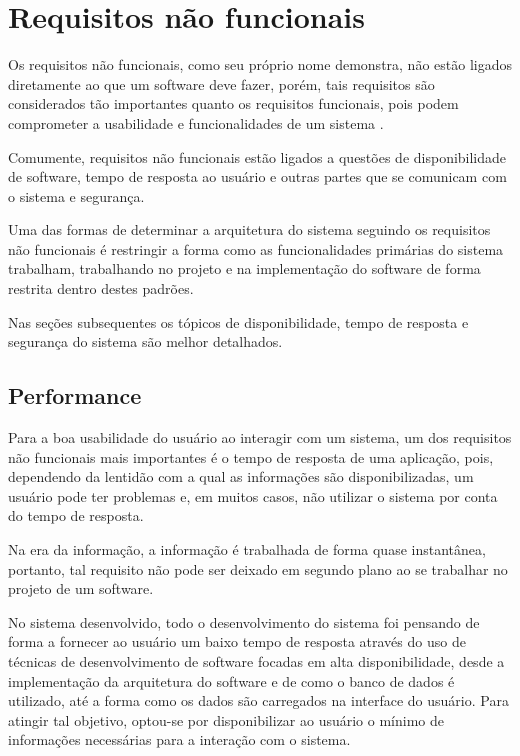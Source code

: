 \section{Requisitos não funcionais}

Os requisitos não funcionais, como seu próprio nome demonstra, não estão ligados diretamente ao que um software deve fazer, porém, tais requisitos são considerados tão importantes quanto os requisitos funcionais, pois podem comprometer a usabilidade e funcionalidades de um sistema \cite{engenharia_software_sommerville}.

Comumente, requisitos não funcionais estão ligados a questões de disponibilidade de software, tempo de resposta ao usuário e outras partes que se comunicam com o sistema e segurança.

Uma das formas de determinar a arquitetura do sistema seguindo os requisitos não funcionais é restringir a forma como as funcionalidades primárias do sistema trabalham, trabalhando no projeto e na implementação do software de forma restrita dentro destes padrões.

Nas seções subsequentes os tópicos de disponibilidade, tempo de resposta e segurança do sistema são melhor detalhados.

\subsection{Performance}

Para a boa usabilidade do usuário ao interagir com um sistema, um dos requisitos não funcionais mais importantes é o tempo de resposta de uma aplicação, pois, dependendo da lentidão com a qual as informações são disponibilizadas, um usuário pode ter problemas e, em muitos casos, não utilizar o sistema por conta do tempo de resposta.

Na era da informação, a informação é trabalhada de forma quase instantânea, portanto, tal requisito não pode ser deixado em segundo plano ao se trabalhar no projeto de um software.

No sistema desenvolvido, todo o desenvolvimento do sistema foi pensando de forma a fornecer ao usuário um baixo tempo de resposta através do uso de técnicas de desenvolvimento de software focadas em alta disponibilidade, desde a implementação da arquitetura do software e de como o banco de dados é utilizado, até a forma como os dados são carregados na interface do usuário. Para atingir tal objetivo, optou-se por disponibilizar ao usuário o mínimo de informações necessárias para a interação com o sistema.

